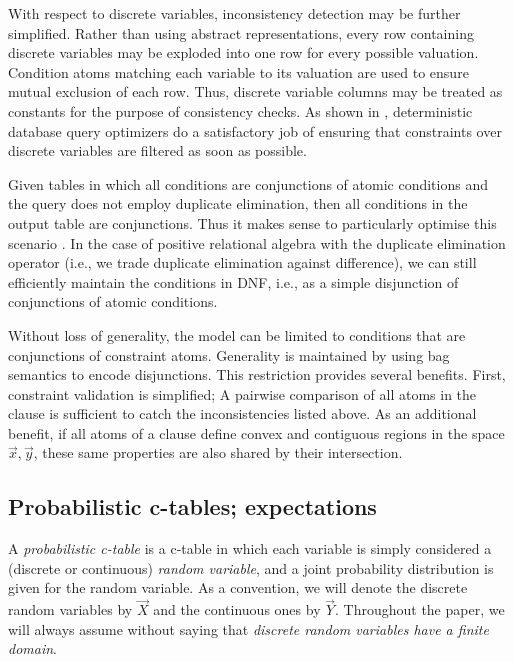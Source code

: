 With  respect to  discrete variables,  inconsistency detection  may be
further simplified.  Rather than using abstract representations, every
row containing  discrete variables  may be exploded  into one  row for
every possible valuation.  Condition atoms matching each variable to its
valuation  are used  to ensure  mutual exclusion  of each  row.  Thus,
discrete variable columns may be  treated as constants for the purpose
of  consistency checks.  As  shown in  \cite{AJKO2008}, deterministic
database  query optimizers  do  a satisfactory  job  of ensuring  that
constraints over discrete variables are filtered as soon as possible.

Given  tables  in which  all  conditions  are  conjunctions of  atomic
conditions and  the query does not employ  duplicate elimination, then
all conditions  in the output  table are conjunctions.  Thus  it makes
sense to particularly optimise this scenario \cite{AJKO2008}.
In the case of positive
relational algebra  with the duplicate elimination  operator (i.e., we
trade  duplicate   elimination  against  difference),   we  can  still
efficiently  maintain  the  conditions  in  DNF,  i.e.,  as  a  simple
disjunction of conjunctions of atomic conditions.

Without loss of generality, the model can be limited to conditions that
are conjunctions of
constraint  atoms.  Generality  is maintained by  using bag  semantics to
encode disjunctions. This  restriction   provides   several  benefits.
First,
constraint  validation is  simplified;  A pairwise  comparison of  all
atoms in the clause is  sufficient to catch the inconsistencies listed
above.   As an additional  benefit, if  all atoms  of a  clause define
convex and  contiguous regions in the space $\vec{x},\vec{y}$, these same
properties are also shared by their intersection.




\subsection{Probabilistic c-tables; expectations}
\label{sec:montecarlo}


A \textit{probabilistic  c-table} is a c-table in  which each variable is
simply considered a (discrete  or continuous) {\em random variable}\/,
and a joint probability distribution is given for the random variable.
As  a convention,  we will  denote  the discrete  random variables  by
$\vec{X}$ and the continuous ones by $\vec{Y}$.  Throughout the paper,
we  will  always  assume  without  saying that  {\em  discrete  random
variables have a finite domain}\/.

